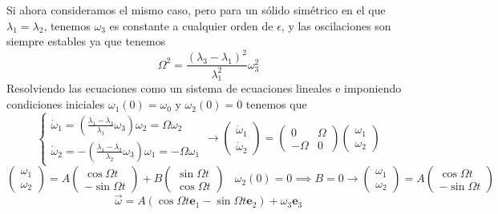 Si ahora consideramos el mismo caso, pero para un sólido simétrico en el que $\lambda_1 = \lambda_2$, tenemos $\omega_3$ es constante a cualquier orden de $\epsilon$, y las oscilaciones son siempre estables ya que tenemos
\begin{equation} \label{6.1.1}
    \Omega^2 = \frac{(\lambda_3-\lambda_1)^2}{\lambda_1^2} \omega_3^2
\end{equation}
Resolviendo las ecuaciones como un sistema de ecuaciones lineales e imponiendo condiciones iniciales $\omega_1(0)=\omega_0$ y $\omega_2(0)=0$ tenemos que
\[
    \left\{\begin{matrix}
        \dot{\omega}_1  = \left(\frac{\lambda_1-\lambda_3}{\lambda_1} \omega_3\right) \omega_2 = \Omega \omega_2 \\
        \dot{\omega}_2  = -\left(\frac{\lambda_1-\lambda_3}{\lambda_2} \omega_3\right)  \omega_1 = -\Omega \omega_1
    \end{matrix}\right. \rightarrow \left(\begin{matrix}
        \dot{\omega}_1 \\ \dot{\omega}_2
    \end{matrix}\right) = \left(\begin{matrix}
        0 & \Omega \\ -\Omega & 0 
    \end{matrix}\right) \left(\begin{matrix}
        \omega_1 \\ \omega_2
    \end{matrix}\right)
\]
\begin{equation} \label{6.1.1}
    \left(\begin{matrix}
        \omega_1 \\ \omega_2
    \end{matrix}\right) = A \left(\begin{matrix}
        \cos{\Omega t} \\ -\sin{\Omega t}
    \end{matrix}\right) + B \left(\begin{matrix}
        \sin{\Omega t} \\ \cos{\Omega t}
    \end{matrix}\right) \ \ \ \ \omega_2(0) = 0 \implies B=0 \rightarrow \left(\begin{matrix}
        \omega_1 \\ \omega_2
    \end{matrix}\right) = A \left(\begin{matrix}
        \cos{\Omega t} \\ -\sin{\Omega t}
    \end{matrix}\right)
\end{equation}
\begin{equation} \label{6.1.1}
    \vec{\omega} = A(\cos\Omega t \mathbf{e}_1 - \sin\Omega t \mathbf{e}_2) + \omega_3 \mathbf{e}_3
\end{equation}

